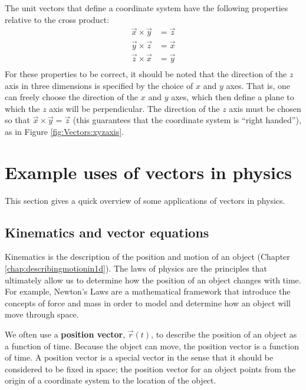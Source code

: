 
The unit vectors that define a coordinate system have the following properties relative to the cross product:
\begin{align*}
\vec x \times \vec y &= \vec z\\
\vec y \times \vec z &= \vec x\\
\vec z \times \vec x &= \vec y\\
\end{align*}
For these properties to be correct, it should be noted that the direction of the $z$ axis in three dimensions is specified by the choice of $x$ and $y$ axes. That is, one can freely choose the direction of the $x$ and $y$ axes, which then define a plane to which the $z$ axis will be perpendicular. The direction of the $z$ axis must be chosen so that $\vec x \times \vec y = \vec z$ (this guarantees that the coordinate system is ``right handed''), as in Figure \ref{fig:Vectors:xyzaxis}.

\section{Example uses of vectors in physics}
This section gives a quick overview of some applications of vectors in physics.
\subsection{Kinematics and vector equations}
Kinematics is the description of the position and motion of an object (Chapter \ref{chap:describingmotionin1d}). The laws of physics are the principles that ultimately allow us to determine how the position of an object changes with time. For example, Newton's Laws are a mathematical framework that introduce the concepts of force and mass in order to model and determine how an object will move through space.

We often use a \textbf{position vector}, $\vec r(t)$, to describe the position of an object as a function of time. Because the object can move, the position vector is a function of time. A position vector is a special vector in the sense that it should be considered to be fixed in space; the position vector for an object points from the origin of a coordinate system to the location of the object. 

